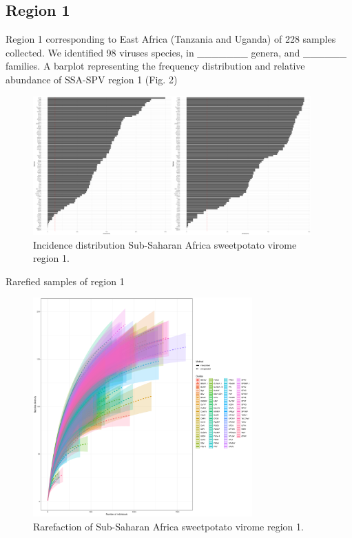 \documentclass{article}
\begin{document}
\subsection{Region 1}

Region 1 corresponding to East Africa (Tanzania and Uganda) of 228 samples collected. We identified 98 viruses species, in \_\_\_\_\_\_\_ genera, and \_\_\_\_\_\_ families.  A barplot representing the frequency distribution and relative abundance of SSA-SPV region 1 (Fig. 2)

\begin{figure}[h!]
\begin{center}
\includegraphics[width=0.95\textwidth]{../results/k-cluster1/1-kcluster_incidence_w+bFeb28.pdf
} %
\caption{Incidence distribution Sub-Saharan Africa sweetpotato virome region 1.}
\end{center}
\end{figure}

Rarefied samples of region 1

\begin{figure}[h!]
\begin{center}
\includegraphics[width=0.75\textwidth]{../results/k-cluster1/1-kcluster_rarefaction-iNEXT_Feb28.pdf
} %
\caption{Rarefaction of Sub-Saharan Africa sweetpotato virome region 1.}
\end{center}
\end{figure}
\end{document}

